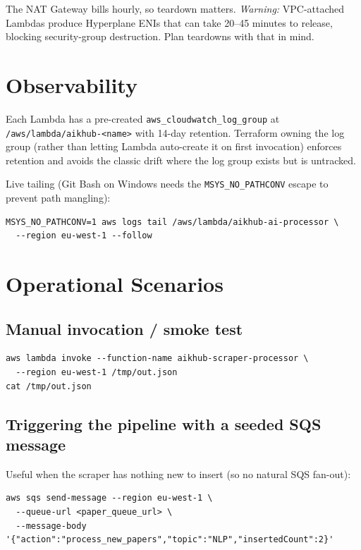 \documentclass[11pt,a4paper]{article}
\begin{document}
The NAT Gateway bills hourly, so teardown matters. \emph{Warning:} VPC-attached Lambdas produce Hyperplane ENIs that can take 20--45 minutes to release, blocking security-group destruction. Plan teardowns with that in mind.

\section{Observability}

Each Lambda has a pre-created \texttt{aws\_cloudwatch\_log\_group} at \texttt{/aws/lambda/aikhub-<name>} with 14-day retention. Terraform owning the log group (rather than letting Lambda auto-create it on first invocation) enforces retention and avoids the classic drift where the log group exists but is untracked.

Live tailing (Git Bash on Windows needs the \texttt{MSYS\_NO\_PATHCONV} escape to prevent path mangling):

\begin{lstlisting}[basicstyle=\ttfamily\small]
MSYS_NO_PATHCONV=1 aws logs tail /aws/lambda/aikhub-ai-processor \
  --region eu-west-1 --follow
\end{lstlisting}

\section{Operational Scenarios}

\subsection{Manual invocation / smoke test}
\begin{lstlisting}[basicstyle=\ttfamily\small]
aws lambda invoke --function-name aikhub-scraper-processor \
  --region eu-west-1 /tmp/out.json
cat /tmp/out.json
\end{lstlisting}

\subsection{Triggering the pipeline with a seeded SQS message}
Useful when the scraper has nothing new to insert (so no natural SQS fan-out):
\begin{lstlisting}[basicstyle=\ttfamily\small]
aws sqs send-message --region eu-west-1 \
  --queue-url <paper_queue_url> \
  --message-body '{"action":"process_new_papers","topic":"NLP","insertedCount":2}'
\end{lstlisting}
\end{document}

